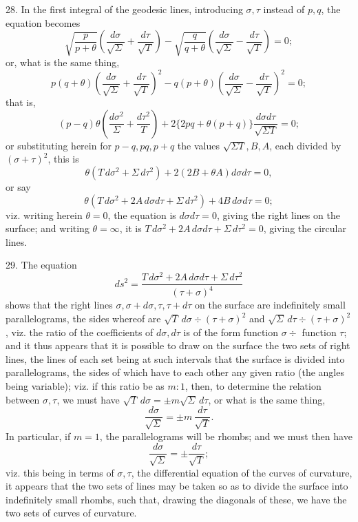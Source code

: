 \documentclass[11pt,a4paper]{article}
\begin{document}
28. In the first integral of the geodesic lines, introducing $\sigma,\tau$ instead of $p,q$,
the equation becomes
\[
 \sqrt{\frac{p}{p+\theta}}\left(\frac{d\sigma}{\sqrt\Sigma}
 +\frac{d\tau}{\sqrt T}\right)
 -\sqrt{\frac{q}{q+\theta}}\left(\frac{d\sigma}{\sqrt\Sigma}
 -\frac{d\tau}{\sqrt T}\right)=0;
\]
or, what is the same thing,
\[
 p(q+\theta)\left(\frac{d\sigma}{\sqrt\Sigma}
 +\frac{d\tau}{\sqrt T}\right)^2
 -q(p+\theta)\left(\frac{d\sigma}{\sqrt\Sigma}
 -\frac{d\tau}{\sqrt T}\right)^2=0;
\]
that is,
\[
 (p-q)\theta\left(\frac{d\sigma^2}{\Sigma}+\frac{d\tau^2}{T}\right)
 +2\{2pq+\theta(p+q)\}\frac{d\sigma d\tau}{\sqrt{\Sigma T}}=0;
\]
or substituting herein for $p-q,pq,p+q$ the values $\sqrt{\Sigma T},B,A$, each divided
by $(\sigma+\tau)^2$, this is
\[
 \theta(T\,d\sigma^2+\Sigma\,d\tau^2)+2(2B+\theta A)d\sigma d\tau=0,
\]
or say
\[
 \theta(T\,d\sigma^2+2A\,d\sigma d\tau+\Sigma\,d\tau^2)+4B\,d\sigma d\tau=0;
\]
viz. writing herein $\theta=0$, the equation is $d\sigma d\tau=0$, giving the right lines on
the surface; and writing $\theta=\infty$, it is
$T\,d\sigma^2+2A\,d\sigma d\tau+\Sigma\,d\tau^2=0$, giving the circular lines.

29. The equation
\[
 ds^2=\frac{T\,d\sigma^2+2A\,d\sigma d\tau+\Sigma\,d\tau^2}{(\tau+\sigma)^4}
\]
shows that the right lines $\sigma,\sigma+d\sigma,\tau,\tau+d\tau$ on the surface are
indefinitely small parallelograms, the sides whereof are $\sqrt T\,d\sigma\div(\tau+\sigma)^2$
and $\sqrt\Sigma\,d\tau\div(\tau+\sigma)^2$, viz. the ratio of the coefficients of
$d\sigma,d\tau$ is of the form function $\sigma\div$ function $\tau$; and it thus appears
that it is possible to draw on the surface the two sets of right lines, the lines of each set
being at such intervals that the surface is divided into parallelograms, the sides of which
have to each other any given ratio (the angles being variable); viz. if this ratio be as
$m:1$, then, to determine the relation between $\sigma,\tau$, we must have
$\sqrt T\,d\sigma=\pm m\sqrt\Sigma\,d\tau$, or what is the same thing,
\[
 \frac{d\sigma}{\sqrt\Sigma}=\pm m\,\frac{d\tau}{\sqrt T}.
\]
In particular, if $m=1$, the parallelograms will be rhombs; and we must then have
\[
 \frac{d\sigma}{\sqrt\Sigma}=\pm\frac{d\tau}{\sqrt T};
\]
viz. this being in terms of $\sigma,\tau$, the differential equation of the curves of
curvature, it appears that the two sets of lines may be taken so as to divide the surface into
indefinitely small rhombs, such that, drawing the diagonals of these, we have the two sets of
curves of curvature.
\end{document}
